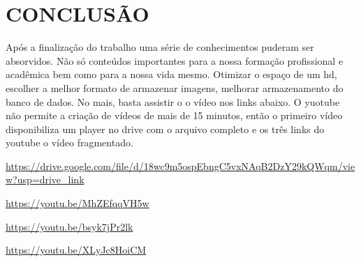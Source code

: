 \captionsetup{justification=centering,margin=0cm}

\chapter[CONCLUSÃO]{CONCLUSÃO}
\label{cap:conclusão}

Após a finalização do trabalho uma série de conhecimentos puderam ser absorvidos. Não só conteúdos importantes para a nossa formação profissional e acadêmica bem como para a nossa vida mesmo. Otimizar o espaço de um hd, escolher a melhor formato de armazenar imagens, melhorar armazenamento do banco de dados. No mais, basta assistir o o vídeo nos links abaixo. O yuotube não permite a criação de vídeos de mais de 15 minutos, então o primeiro vídeo disponibiliza um player no drive com o arquivo completo e os três links do youtube o vídeo fragmentado.

\url{https://drive.google.com/file/d/18wc9m5ospEbngC5vxNAqB2DzY29kQWqm/view?usp=drive_link}

\url{https://youtu.be/MhZEfqqVH5w}

\url{https://youtu.be/bsyk7jPr2lk}

\url{https://youtu.be/XLyJc8HoiCM}